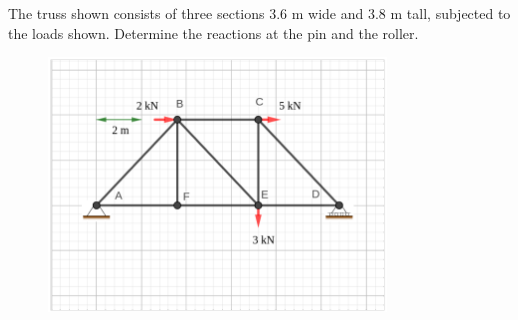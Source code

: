 
The truss shown consists of three sections 3.6 m wide and 3.8 m tall, subjected to the loads shown.
Determine the reactions at the pin and the roller.

\begin{figure}[ht!]
  \centering
  \includegraphics[width=0.8\textwidth,height=0.5\textheight,keepaspectratio]{fig.png}
\end{figure}

\iftoggle{flagSoln}{%
\vspace{.5cm}
\rule{\textwidth}{.4pt}
\vspace{.5cm}
\textbf{Solution:}
$D = 4.463 kN$ up, $A_x = 7 kN$, $A_y = 1.463 kN$ down
}{%
}%
